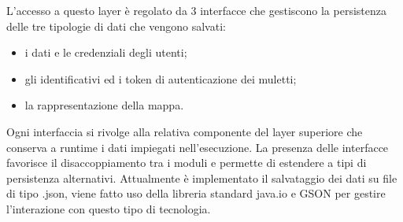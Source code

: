 L'accesso a questo layer è regolato da 3 interfacce che gestiscono la persistenza delle tre tipologie di dati che vengono salvati:
\begin{itemize}
	\item i dati e le credenziali degli utenti;
	\item gli identificativi ed i token di autenticazione dei muletti;
	\item la rappresentazione della mappa.
\end{itemize}

Ogni interfaccia si rivolge alla relativa componente del layer superiore che conserva a runtime i dati impiegati nell'esecuzione. La presenza delle interfacce favorisce il disaccoppiamento tra i moduli e permette di estendere a tipi di persistenza alternativi. Attualmente è implementato il salvataggio dei dati su file di tipo .json, viene fatto uso della libreria standard java.io e GSON per gestire l'interazione con questo tipo di tecnologia.


\pagebreak
